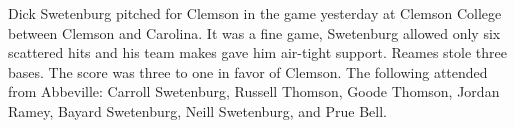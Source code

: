 
Dick Swetenburg pitched for Clemson in the game yesterday at Clemson
College between Clemson and Carolina.  It was a fine game, Swetenburg
allowed only six scattered hits and his team makes gave him air-tight
support.  Reames stole three bases.  The score was three to one in
favor of Clemson.  The following attended from Abbeville: Carroll
Swetenburg, Russell Thomson, Goode Thomson, Jordan Ramey, Bayard
Swetenburg, Neill Swetenburg, and Prue Bell.
